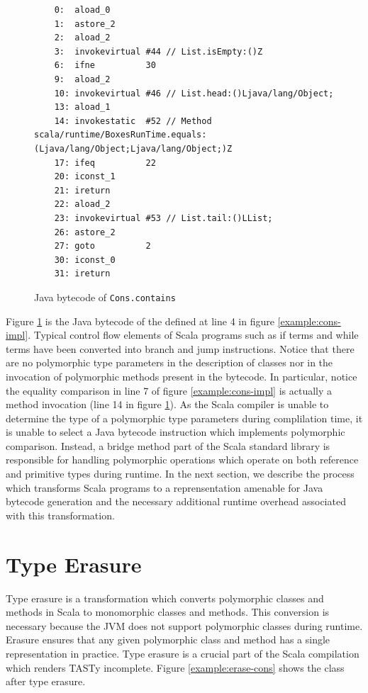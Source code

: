 \begin{figure}[!htb]
	\begin{verbatim}
	0:  aload_0
 	1:  astore_2
	2:  aload_2
	3:  invokevirtual #44 // List.isEmpty:()Z
	6:  ifne          30
	9:  aload_2
	10: invokevirtual #46 // List.head:()Ljava/lang/Object;
	13: aload_1
	14: invokestatic  #52 // Method scala/runtime/BoxesRunTime.equals:(Ljava/lang/Object;Ljava/lang/Object;)Z
	17: ifeq          22
	20: iconst_1
	21: ireturn
	22: aload_2
	23: invokevirtual #53 // List.tail:()LList;
	26: astore_2
	27: goto          2
	30: iconst_0
	31: ireturn
	\end{verbatim}
	\caption{Java bytecode of \texttt{Cons.contains}}
	\label{example:contains-bytecode}
\end{figure}

Figure \ref{example:contains-bytecode} is the Java bytecode of the  defined at line 4 in figure \ref{example:cons-impl}.
Typical control flow elements of Scala programs such as if terms and while terms have been converted into branch and jump instructions.
Notice that there are no polymorphic type parameters in the description of classes nor in the invocation of polymorphic methods present in the bytecode.
In particular, notice the equality comparison in line 7 of figure \ref{example:cons-impl} is actually a method invocation (line 14 in figure \ref{example:contains-bytecode}).
As the Scala compiler is unable to determine the type of a polymorphic type parameters during complilation time, it is unable to select a Java bytecode instruction which implements polymorphic comparison.
Instead, a bridge method part of the Scala standard library is responsible for handling polymorphic operations which operate on both reference and primitive types during runtime.
In the next section, we describe the process which transforms Scala programs to a reprensentation amenable for Java bytecode generation and the necessary additional runtime overhead associated with this transformation.

\section{Type Erasure}
\label{background:type-erasure}

Type erasure\cite{java:generics} is a transformation which converts polymorphic classes and methods in Scala to monomorphic classes and methods. 
This conversion is necessary because the JVM does not support polymorphic classes during runtime.
Erasure ensures that any given polymorphic class and method has a single representation in practice.
Type erasure is a crucial part of the Scala compilation which renders TASTy incomplete.
Figure \ref{example:erase-cons} shows the  class after type erasure.

